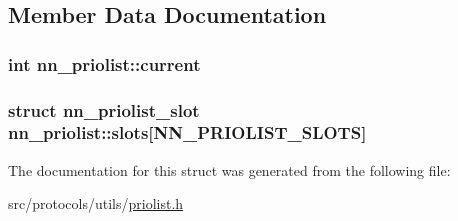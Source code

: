 \subsection{Member Data Documentation}
\subsubsection[{current}]{\setlength{\rightskip}{0pt plus 5cm}int nn\+\_\+priolist\+::current}\hypertarget{structnn__priolist_ad3ba3f789844959e4796cabf18acebcf}{}\label{structnn__priolist_ad3ba3f789844959e4796cabf18acebcf}
\subsubsection[{slots}]{\setlength{\rightskip}{0pt plus 5cm}struct {\bf nn\+\_\+priolist\+\_\+slot} nn\+\_\+priolist\+::slots\mbox{[}{\bf N\+N\+\_\+\+P\+R\+I\+O\+L\+I\+S\+T\+\_\+\+S\+L\+O\+TS}\mbox{]}}\hypertarget{structnn__priolist_a2325d0c41356c41805714ce2e14a6d11}{}\label{structnn__priolist_a2325d0c41356c41805714ce2e14a6d11}


The documentation for this struct was generated from the following file\+:\begin{DoxyCompactItemize}
\item 
src/protocols/utils/\hyperlink{priolist_8h}{priolist.\+h}\end{DoxyCompactItemize}
